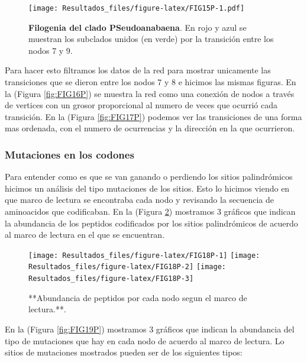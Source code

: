 \documentclass[
]{book}
\begin{document}
\begin{figure}
\centering
\texttt{[image: Resultados\_files/figure-latex/FIG15P-1.pdf]}
\caption{\label{fig:FIG15P}\textbf{Filogenia del clado PSeudoanabaena}. En rojo y azul se muestran los subclados unidos (en verde) por la transición entre los nodos 7 y 9.}
\end{figure}

Para hacer esto filtramos los datos de la red para mostrar unicamente las transiciones que se dieron entre los nodos 7 y 8 e hicimos las mismas figuras.
En la (Figura \ref{fig:FIG16P}) se muestra la red como una conexión de nodos a través de vertices con un grosor proporcional al numero de veces que ocurrió cada transición. En la (Figura \ref{fig:FIG17P}) podemos ver las transiciones de una forma mas ordenada, con el numero de ocurrencias y la dirección en la que ocurrieron.

\hypertarget{mutaciones-en-los-codones-4}{%
\subsubsection{Mutaciones en los codones}\label{mutaciones-en-los-codones-4}}

Para entender como es que se van ganando o perdiendo los sitios palindrómicos hicimos un análisis del tipo mutaciones de los sitios. Esto lo hicimos viendo en que marco de lectura se encontraba cada nodo y revisando la secuencia de aminoacidos que codificaban. En la (Figura \ref{fig:FIG18P}) mostramos 3 gráficos que indican la abundancia de los peptidos codificados por los sitios palindrómicos de acuerdo al marco de lectura en el que se encuentran.

\begin{figure}

{\centering \texttt{[image: Resultados\_files/figure-latex/FIG18P-1]} \texttt{[image: Resultados\_files/figure-latex/FIG18P-2]} \texttt{[image: Resultados\_files/figure-latex/FIG18P-3]} 

}

\caption{**Abundancia de peptidos por cada nodo segun el marco de lectura.**.}\label{fig:FIG18P}
\end{figure}

En la (Figura \ref{fig:FIG19P}) mostramos 3 gráficos que indican la abundancia del tipo de mutaciones que hay en cada nodo de acuerdo al marco de lectura. Lo sitios de mutaciones mostrados pueden ser de los siguientes tipos:
\end{document}
